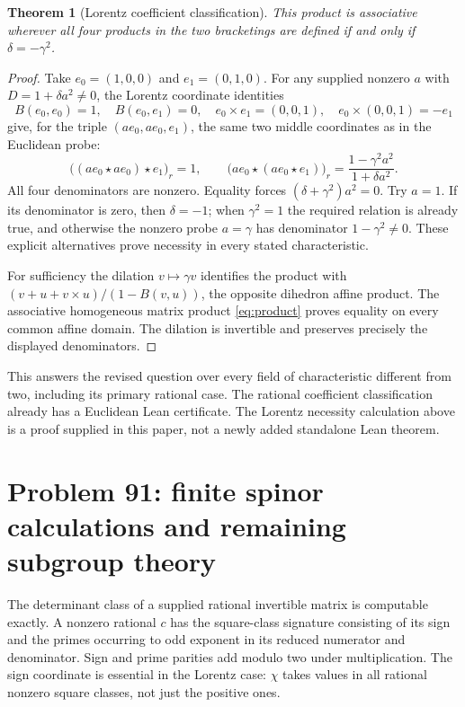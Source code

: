\documentclass[11pt]{article}
\newtheorem{theorem}{Theorem}[section]
\theoremstyle{remark}
\begin{document}
\begin{theorem}[Lorentz coefficient classification]
This product is associative wherever all four products in the two
bracketings are defined if and only if \(\delta=-\gamma^2\).
\end{theorem}
\begin{proof}
Take \(e_0=(1,0,0)\) and \(e_1=(0,1,0)\). For any supplied nonzero
\(a\) with \(D=1+\delta a^2\ne0\), the Lorentz coordinate
identities
\[
 B(e_0,e_0)=1,\quad B(e_0,e_1)=0,\quad
 e_0\times e_1=(0,0,1),\quad e_0\times(0,0,1)=-e_1
\]
give, for the triple \((ae_0,ae_0,e_1)\), the same two middle coordinates
as in the Euclidean probe:
\[
 \bigl((ae_0\star ae_0)\star e_1\bigr)_r=1,\qquad
 \bigl(ae_0\star(ae_0\star e_1)\bigr)_r
     =\frac{1-\gamma^2a^2}{1+\delta a^2}.
\]
All four denominators are nonzero. Equality forces
\((\delta+\gamma^2)a^2=0\). Try \(a=1\). If its denominator is zero,
then \(\delta=-1\); when \(\gamma^2=1\) the required relation is already
true, and otherwise the nonzero probe \(a=\gamma\) has denominator
\(1-\gamma^2\ne0\). These explicit alternatives prove necessity in every
stated characteristic.

For sufficiency the dilation \(v\mapsto\gamma v\) identifies the product
with \((v+u+v\times u)/(1-B(v,u))\), the opposite dihedron affine product.
The associative homogeneous matrix product \eqref{eq:product} proves
equality on every common affine domain. The dilation is invertible and
preserves precisely the displayed denominators.
\end{proof}

This answers the revised question over every field of characteristic
different from two, including its primary rational case. The rational
coefficient classification already has a Euclidean Lean certificate. The
Lorentz necessity calculation above is a proof supplied in this paper, not
a newly added standalone Lean theorem.

\section{Problem 91: finite spinor calculations and remaining subgroup theory}

The determinant class of a supplied rational invertible matrix is computable
exactly. A nonzero rational \(c\) has the square-class signature consisting
of its sign and the primes occurring to odd exponent in its reduced
numerator and denominator. Sign and prime parities add modulo two under
multiplication. The sign coordinate is essential in the Lorentz case:
\(\chi\) takes values in all rational nonzero square classes, not just the
positive ones.
\end{document}
